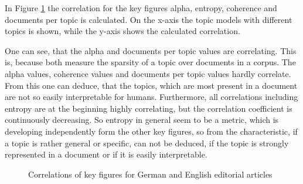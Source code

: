 In Figure \ref{Corr} the correlation for the key figures alpha, entropy, coherence and documents per topic is calculated. 
On the x-axis the topic models with different topics is shown, while the y-axis shows the calculated correlation.

One can see, that the alpha and documents per topic values are correlating. This is, because both 
measure the sparsity of a topic over documents in a corpus. The alpha values, coherence values and documents
per topic values hardly correlate. From this one can deduce, that the topics, which are most present 
in a document are not so easily interpretable for humans. Furthermore, all correlations including 
entropy are at the beginning highly correlating, but the correlation coefficient is continuously decreasing. 
So entropy in general seem to be a metric, which is developing independently form the other key
figures, so from the characteristic, if a topic is rather general or specific, can not be deduced, 
if the topic is strongly represented in a document or if it is easily interpretable.

\begin{figure}
	\begin{minipage}[t]{0.5\textwidth}
	\end{minipage}
	\begin{minipage}[t]{0.5\textwidth}
	\end{minipage}
\caption[]{Correlations of key figures for German and English editorial articles}
\label{Corr}
\end{figure}

